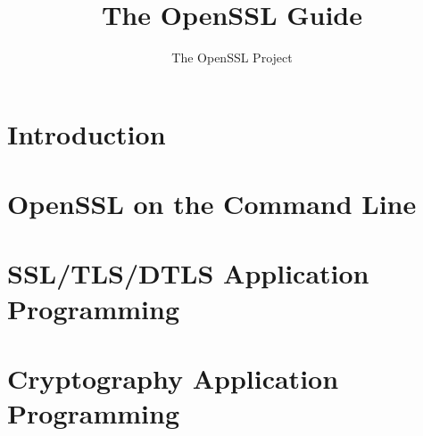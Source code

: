 \documentclass[oneside]{book}
\author{The OpenSSL Project}
\title{The OpenSSL Guide}
\begin{document}
\lstset{style=osslc}
\maketitle
\tableofcontents

\part{Introduction}



\part{OpenSSL on the Command Line}

\part{SSL/TLS/DTLS Application Programming}

\part{Cryptography Application Programming}
\end{document}
